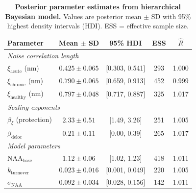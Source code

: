 \documentclass[10pt,a4paper]{article}
\begin{document}
\begin{table}[htbp]
\centering
\caption{\textbf{Posterior parameter estimates from hierarchical Bayesian model.} Values are posterior mean $\pm$ SD with 95\% highest density intervals (HDI). ESS = effective sample size.}
\label{tab:posteriors}
\begin{tabular}{lcccc}
\toprule
\textbf{Parameter} & \textbf{Mean $\pm$ SD} & \textbf{95\% HDI} & \textbf{ESS} & \textbf{$\hat{R}$} \\
\midrule
\multicolumn{5}{l}{\textit{Noise correlation length}} \\
$\xi_{\text{acute}}$ (nm) & $0.425 \pm 0.065$ & [0.303, 0.541] & 293 & 1.000 \\
$\xi_{\text{chronic}}$ (nm) & $0.790 \pm 0.065$ & [0.659, 0.913] & 452 & 0.999 \\
$\xi_{\text{healthy}}$ (nm) & $0.797 \pm 0.048$ & [0.717, 0.887] & 325 & 1.017 \\
\midrule
\multicolumn{5}{l}{\textit{Scaling exponents}} \\
$\beta_\xi$ (protection) & $2.33 \pm 0.51$ & [1.49, 3.26] & 251 & 1.005 \\
$\beta_{\text{deloc}}$ & $0.21 \pm 0.11$ & [0.00, 0.39] & 265 & 1.017 \\
\midrule
\multicolumn{5}{l}{\textit{Model parameters}} \\
NAA$_{\text{base}}$ & $1.12 \pm 0.06$ & [1.02, 1.23] & 418 & 1.011 \\
$k_{\text{turnover}}$ & $0.023 \pm 0.016$ & [0.001, 0.049] & 220 & 1.005 \\
$\sigma_{\text{NAA}}$ & $0.092 \pm 0.034$ & [0.028, 0.156] & 142 & 1.011 \\
\bottomrule
\end{tabular}
\end{table}
\end{document}
